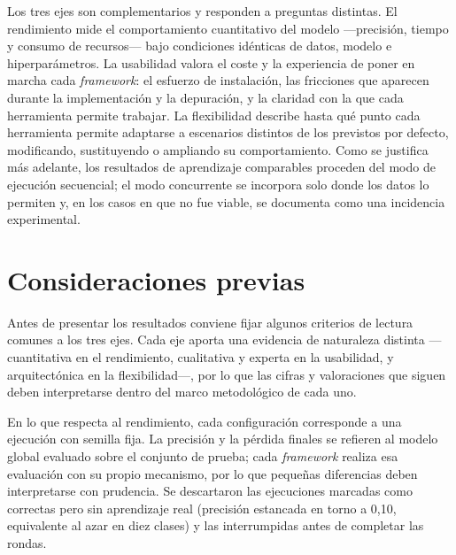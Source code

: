 Los tres ejes son complementarios y responden a preguntas distintas. El rendimiento
mide el comportamiento cuantitativo del modelo —precisión, tiempo y consumo de
recursos— bajo condiciones idénticas de datos, modelo e hiperparámetros. La
usabilidad valora el coste y la experiencia de poner en marcha cada
\textit{framework}: el esfuerzo de instalación, las fricciones que aparecen durante
la implementación y la depuración, y la claridad con la que cada herramienta permite
trabajar. La flexibilidad describe hasta qué punto cada herramienta permite
adaptarse a escenarios distintos de los previstos por defecto, modificando,
sustituyendo o ampliando su comportamiento. Como se justifica más adelante, los
resultados de aprendizaje comparables proceden del modo de ejecución secuencial; el
modo concurrente se incorpora solo donde los datos lo permiten y, en los casos en
que no fue viable, se documenta como una incidencia experimental.

\section{Consideraciones previas}\label{sec:consideraciones-resultados}

Antes de presentar los resultados conviene fijar algunos criterios de lectura
comunes a los tres ejes. Cada eje aporta una evidencia de naturaleza distinta
—cuantitativa en el rendimiento, cualitativa y experta en la usabilidad, y
arquitectónica en la flexibilidad—, por lo que las cifras y valoraciones que siguen
deben interpretarse dentro del marco metodológico de cada uno.

En lo que respecta al rendimiento, cada configuración corresponde a una ejecución
con semilla fija. La precisión y la pérdida finales se refieren al modelo global
evaluado sobre el conjunto de prueba; cada \textit{framework} realiza esa evaluación
con su propio mecanismo, por lo que pequeñas diferencias deben interpretarse con
prudencia. Se descartaron las ejecuciones marcadas como correctas pero sin
aprendizaje real (precisión estancada en torno a 0{,}10, equivalente al azar en diez
clases) y las interrumpidas antes de completar las rondas.

